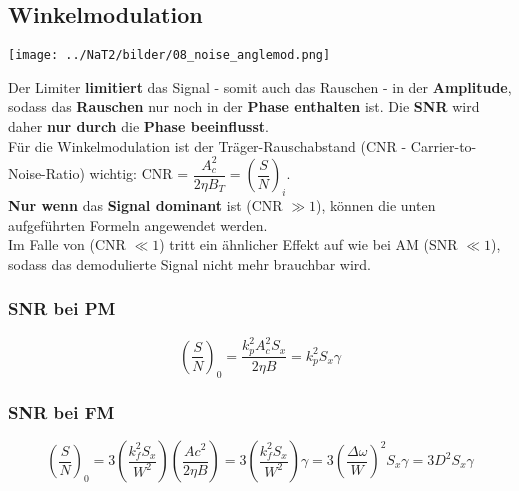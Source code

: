 \subsection{Winkelmodulation }
\begin{center}
	\texttt{[image: ../NaT2/bilder/08\_noise\_anglemod.png]}
\end{center}
Der Limiter \textbf{limitiert} das Signal - somit auch das Rauschen - in der \textbf{Amplitude}, 
sodass das \textbf{Rauschen} nur noch in der \textbf{Phase enthalten} ist. 
Die \textbf{SNR} wird daher \textbf{nur durch }die \textbf{Phase beeinflusst}. \\ 

Für die Winkelmodulation ist der Träger-Rauschabstand (CNR - Carrier-to-Noise-Ratio) wichtig: 
CNR = $ \dfrac{A_c^2}{2 \eta B_T} = \left(\dfrac{S}{N}\right)_i$. \\
\textbf{Nur wenn} das \textbf{Signal dominant} ist (CNR $\gg 1$), können die unten aufgeführten
Formeln angewendet werden. \\ 
Im Falle von (CNR $\ll 1$) tritt ein ähnlicher Effekt auf wie bei AM (SNR $\ll 1$), 
sodass das demodulierte Signal nicht mehr brauchbar wird.

\subsubsection{SNR bei PM }
$$ \left(\dfrac{S}{N}\right)_0 =
\dfrac{k_p^2 A_c^2 S_x}{2 \eta B} = k_p^2 S_x \gamma $$

\subsubsection{SNR bei FM }
$$ \left(\dfrac{S}{N}\right)_0 =
3 \left(\dfrac{k_f^2 S_x}{W^2}\right) \left(\dfrac{Ac^2}{2 \eta B}\right)
= 3 \left(\frac{k_f^2 S_x}{W^2}\right) \gamma = 
3 \left(\dfrac{\Delta \omega}{W}\right)^2 S_x \gamma = 3 D^2 S_x \gamma$$

